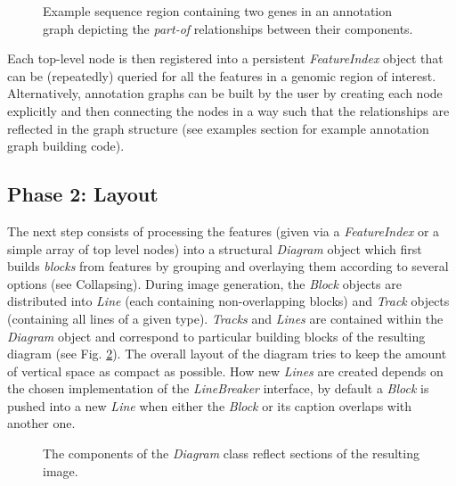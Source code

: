 \documentclass[a4paper]{scrreprt}
\begin{document}
\begin{figure}[ht]
\caption{Example sequence region containing two genes in an annotation graph depicting the \emph{part-of} relationships between their components.}
\label{gfftree}
\end{figure}
Each top-level node is then registered into a persistent \emph{FeatureIndex} object that can be (repeatedly) queried for all the features in a genomic region of interest. Alternatively, annotation graphs can be built by the user by creating each node explicitly and then connecting the nodes in a way such that the relationships are reflected in the graph structure (see examples section for example annotation graph building code).

\subsection{Phase 2: Layout}
The next step consists of processing the features (given via a \emph{FeatureIndex} or a simple array of top level nodes) into a structural \emph{Diagram} object which first builds \emph{blocks} from features by grouping and overlaying them according to several options (see Collapsing). During image generation, the \emph{Block} objects are distributed into \emph{Line} (each containing non-overlapping blocks) and \emph{Track} objects (containing all lines of a given type). \emph{Tracks} and \emph{Lines} are contained within the \emph{Diagram} object and correspond to particular building blocks of the resulting diagram (see Fig. \ref{diagram}). The overall layout of the diagram tries to keep the amount of vertical space as compact as possible. How new \emph{Lines} are created depends on the chosen  implementation of the \emph{LineBreaker} interface, by default a \emph{Block} is pushed into a new \emph{Line} when either the \emph{Block} or its caption overlaps with another one.

\begin{figure}[ht]
\caption{The components of the \emph{Diagram} class reflect sections of the resulting image.}
\label{diagram}
\end{figure}
\end{document}
